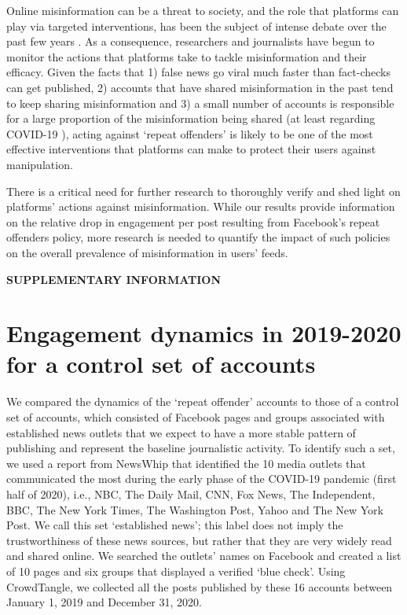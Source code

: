 \documentclass[review]{elsarticle}
\newcommand{\beginsupplement}{%
        \setcounter{table}{0}
        \renewcommand{\thetable}{S\arabic{table}}%
        \setcounter{figure}{0}
        \renewcommand{\thefigure}{S\arabic{figure}}%
     }
\begin{document}
{Online misinformation can be a threat to society, and the role that platforms can play via targeted interventions, has been the subject of intense debate over the past few years \citep{rogers2020deplatforming}. 
As a consequence, researchers \citep{mena2020cleaning, yaqub2020effects} and journalists \citep{FacebookPartisanBias, FacebookCivilityGrowth} have begun to monitor the actions that platforms take to tackle misinformation and their efficacy.
Given the facts that 1) false news go viral much faster than fact-checks can get published, 2) accounts that have shared misinformation in the past tend to keep sharing misinformation and 3) a small number of accounts is responsible for a large proportion of the misinformation being shared (at least regarding COVID-19 \citep{disinformationDozen}), acting against `repeat offenders' is likely to be one of the most effective interventions that platforms can make to protect their users against manipulation.

There is a critical need for further research to thoroughly verify and shed light on platforms' actions against misinformation. 
While our results provide information on the relative drop in engagement per post resulting from Facebook’s repeat offenders policy, more research is needed to quantify the impact of such policies on the overall prevalence of misinformation in users’ feeds.




\newpage

\beginsupplement

\textbf{SUPPLEMENTARY INFORMATION}

\section*{Engagement dynamics in 2019-2020 for a control set of accounts}

We compared the dynamics of the `repeat offender' accounts to those of a control set of accounts, which consisted of Facebook pages and groups associated with established news outlets that we expect to have a more stable pattern of publishing and represent the baseline journalistic activity.
To identify such a set, we used a report from NewsWhip \citep{NewsWhipReport} that identified the 10 media outlets that communicated the most during the early phase of the COVID-19 pandemic (first half of 2020), i.e., NBC, The Daily Mail, CNN, Fox News, The Independent, BBC, The New York Times, The Washington Post, Yahoo and The New York Post. 
We call this set `established news'; this label does not imply the trustworthiness of these news sources, but rather that they are very widely read and shared online. 
We searched the outlets' names on Facebook and created a list of 10 pages and six groups that displayed a verified `blue check'.
Using CrowdTangle, we collected all the posts published by these 16 accounts between January 1, 2019 and December 31, 2020.

}
\end{document}
